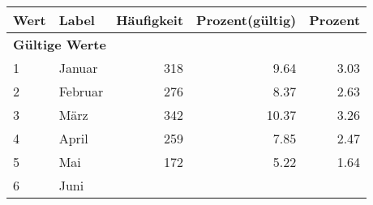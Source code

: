      \begin{longtable}{lXrrr}
     \toprule
     \textbf{Wert} & \textbf{Label} & \textbf{Häufigkeit} & \textbf{Prozent(gültig)} & \textbf{Prozent} \\
     \endhead
     \midrule
     \multicolumn{5}{l}{\textbf{Gültige Werte}}\\

     1 &
     \multicolumn{1}{X}{ Januar   } &


       \num{318} &
       \num[round-mode=places,round-precision=2]{9.64} &
         \num[round-mode=places,round-precision=2]{3.03} \\

     2 &
     \multicolumn{1}{X}{ Februar   } &


       \num{276} &
       \num[round-mode=places,round-precision=2]{8.37} &
         \num[round-mode=places,round-precision=2]{2.63} \\

     3 &
     \multicolumn{1}{X}{ März   } &


       \num{342} &
       \num[round-mode=places,round-precision=2]{10.37} &
         \num[round-mode=places,round-precision=2]{3.26} \\

     4 &
     \multicolumn{1}{X}{ April   } &


       \num{259} &
       \num[round-mode=places,round-precision=2]{7.85} &
         \num[round-mode=places,round-precision=2]{2.47} \\

     5 &
     \multicolumn{1}{X}{ Mai   } &


       \num{172} &
       \num[round-mode=places,round-precision=2]{5.22} &
         \num[round-mode=places,round-precision=2]{1.64} \\

     6 &
     \multicolumn{1}{X}{ Juni   } &



\end{longtable}
